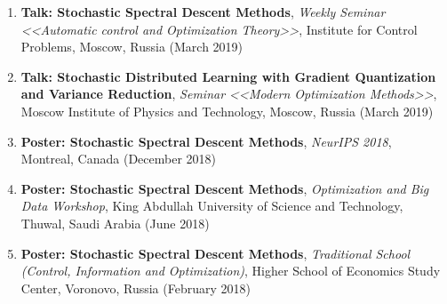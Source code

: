 \begin{enumerate}
\item {\bf Talk: Stochastic Spectral Descent Methods}, {\em Weekly Seminar <<Automatic control and Optimization Theory>>}, Institute for Control Problems, Moscow, Russia (March 2019)
\item {\bf Talk: Stochastic Distributed Learning with Gradient Quantization and Variance Reduction}, {\em Seminar <<Modern Optimization Methods>>}, Moscow Institute of Physics and Technology, Moscow, Russia (March 2019)
\item {\bf Poster: Stochastic Spectral Descent Methods}, {\em NeurIPS 2018}, Montreal, Canada (December 2018)
\item {\bf Poster: Stochastic Spectral Descent Methods}, {\em Optimization and Big Data Workshop}, King Abdullah University of Science and Technology, Thuwal, Saudi Arabia (June 2018)
\item {\bf Poster: Stochastic Spectral Descent Methods}, {\em Traditional School (Control, Information and Optimization)}, Higher School of Economics Study Center, Voronovo, Russia (February 2018)
\end{enumerate}
